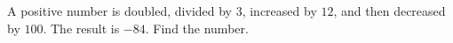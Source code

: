 A positive number is doubled, divided by $3$, increased by $12$, and then decreased by $100$. The result is $-84$. Find the number.
